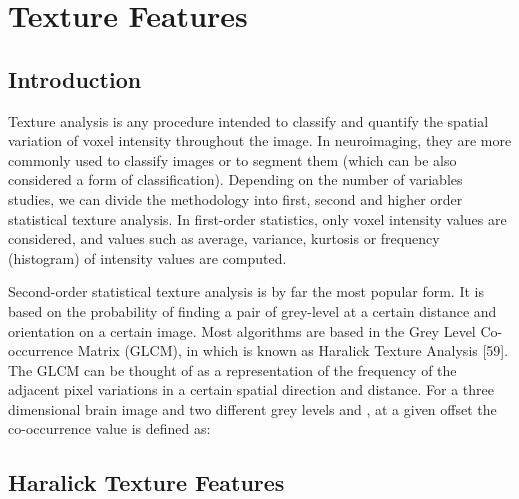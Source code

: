 \chapter{Texture Features}\label{ch:texture}
\section{Introduction}
Texture analysis is any procedure intended to classify and quantify the spatial variation of voxel intensity throughout the image. In neuroimaging, they are more commonly used to classify images or to segment them (which can be also considered a form of classification). Depending on the number of variables studies, we can divide the methodology into first, second and higher order statistical texture analysis. In first-order statistics, only voxel intensity values are considered, and values such as average, variance, kurtosis or frequency (histogram) of intensity values are computed. 

Second-order statistical texture analysis is by far the most popular form. It is based on the probability of finding a pair of grey-level at a certain distance and orientation on a certain image. Most algorithms are based in the Grey Level Co-occurrence Matrix (GLCM), in which is known as Haralick Texture Analysis [59]. The GLCM can be thought of as a representation of the frequency of the adjacent pixel variations in a certain spatial direction and distance. For a three dimensional  brain image  and two different grey levels  and , at a given offset  the co-occurrence value is defined as:

\cite{Martinez-Murcia2013266,Martinez-Murcia2014}
\section{Haralick Texture Features}
